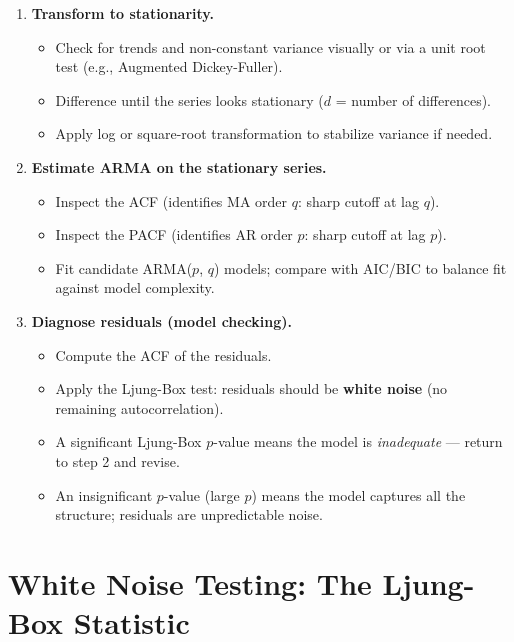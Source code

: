 \documentclass[11pt]{article}
\begin{document}
\begin{enumerate}
    \item \textbf{Transform to stationarity.}
    \begin{itemize}
        \item Check for trends and non-constant variance visually or via a
          unit root test (e.g., Augmented Dickey-Fuller).
        \item Difference until the series looks stationary ($d$ = number of
          differences).
        \item Apply log or square-root transformation to stabilize variance
          if needed.
    \end{itemize}

    \item \textbf{Estimate ARMA on the stationary series.}
    \begin{itemize}
        \item Inspect the ACF (identifies MA order $q$: sharp cutoff at lag $q$).
        \item Inspect the PACF (identifies AR order $p$: sharp cutoff at lag $p$).
        \item Fit candidate ARMA($p$, $q$) models; compare with AIC/BIC to
          balance fit against model complexity.
    \end{itemize}

    \item \textbf{Diagnose residuals (model checking).}
    \begin{itemize}
        \item Compute the ACF of the residuals.
        \item Apply the Ljung-Box test: residuals should be \textbf{white
          noise} (no remaining autocorrelation).
        \item A significant Ljung-Box $p$-value means the model is
          \emph{inadequate} --- return to step 2 and revise.
        \item An insignificant $p$-value (large $p$) means the model
          captures all the structure; residuals are unpredictable noise.
    \end{itemize}
\end{enumerate}


\section{White Noise Testing: The Ljung-Box Statistic}
\end{document}

